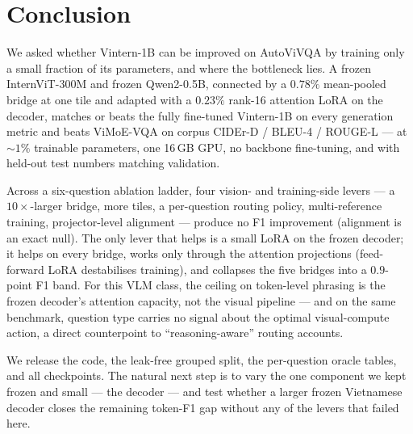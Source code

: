 \section{Conclusion}
\label{sec:conclusion}

We asked whether Vintern-1B can be improved on AutoViVQA by training only a small
fraction of its parameters, and where the bottleneck lies. A frozen InternViT-300M
and frozen Qwen2-0.5B, connected by a $0.78\%$ mean-pooled bridge at one tile and
adapted with a $0.23\%$ rank-16 attention LoRA on the decoder, matches or beats
the fully fine-tuned Vintern-1B on every generation metric and beats ViMoE-VQA on
corpus CIDEr-D / BLEU-4 / ROUGE-L --- at ${\sim}1\%$ trainable parameters, one
16\,GB GPU, no backbone fine-tuning, and with held-out test numbers matching
validation.

Across a six-question ablation ladder, four vision- and training-side levers ---
a $10\times$-larger bridge, more tiles, a per-question routing policy,
multi-reference training, projector-level alignment --- produce no F1 improvement
(alignment is an exact null). The only lever that helps is a small LoRA on the
frozen decoder; it helps on every bridge, works only through the attention
projections (feed-forward LoRA destabilises training), and collapses the five
bridges into a $0.9$-point F1 band. For this VLM class, the ceiling on
token-level phrasing is the frozen decoder's attention capacity, not the visual
pipeline --- and on the same benchmark, question type carries no signal about the
optimal visual-compute action, a direct counterpoint to ``reasoning-aware''
routing accounts.

We release the code, the leak-free grouped split, the per-question oracle tables,
and all checkpoints. The natural next step is to vary the one component we kept
frozen and small --- the decoder --- and test whether a larger frozen Vietnamese
decoder closes the remaining token-F1 gap without any of the levers that failed
here.
